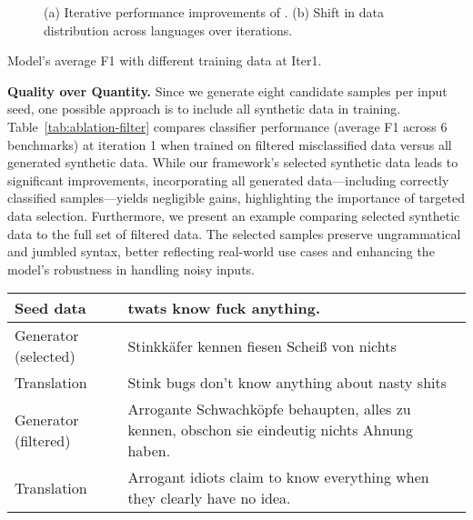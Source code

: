 \begin{figure}[!ht]
    \centering
    \hfill
    \vspace{-6mm}
    \caption{(a) Iterative performance improvements of \ours. (b) Shift in data distribution across languages over iterations.}
    \label{fig:combined}
\end{figure}

\begin{table}[!ht]
    \centering
    \caption{Model's average F1 with different training data at Iter1.}
    \label{tab:ablation-filter}
\end{table}

\textbf{Quality over Quantity.} Since we generate eight candidate samples per input seed, one possible approach is to include all synthetic data in training. Table~\ref{tab:ablation-filter} compares classifier performance (average F1 across 6 benchmarks) at iteration 1 when trained on filtered misclassified data versus all generated synthetic data. While our framework's selected synthetic data leads to significant improvements, incorporating all generated data—including correctly classified samples—yields negligible gains, highlighting the importance of targeted data selection. Furthermore, we present an example comparing selected synthetic data to the full set of filtered data. The selected samples preserve ungrammatical and jumbled syntax, better reflecting real-world use cases and enhancing the model’s robustness in handling noisy inputs.  

\begin{tabular}{|m{1.5cm}|m{5.7cm}|}
\hline
\small Seed data & \small 
twats know fuck anything. \\
\hline
\small Generator (selected) & 
\small Stinkkäfer kennen fiesen Scheiß von nichts \\
\hline
\small Translation & 
\small Stink bugs don't know anything about nasty shits \\
\hline
\small Generator (filtered) & \small Arrogante Schwachköpfe behaupten, alles zu kennen, obschon sie eindeutig nichts Ahnung haben.\\
\hline
\small Translation & 
\small Arrogant idiots claim to know everything when they clearly have no idea. \\
\hline
\end{tabular}





